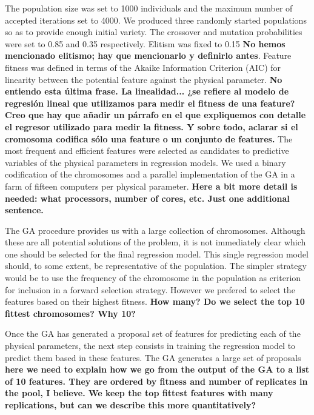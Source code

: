 The population size was set to 1000 individuals and the maximum number
of accepted iterations set to 4000. We produced three randomly started
populations so as to provide enough initial variety. The crossover and
mutation probabilities were set to 0.85 and 0.35 respectively. Elitism
was fixed to 0.15 {\bf No hemos mencionado elitismo; hay que
mencionarlo y definirlo antes}.  Feature fitness was defined in terms
of the Akaike Information Criterion (AIC) for linearity between the
potential feature against the physical parameter. {\bf No entiendo
esta última frase. La linealidad... ¿se refiere al modelo de regresión
lineal que utilizamos para medir el fitness de una feature? Creo que
hay que añadir un párrafo en el que expliquemos con detalle el
regresor utilizado para medir la fitness. Y sobre todo, aclarar si el
cromosoma codifica sólo una feature o un conjunto de features.} The
most frequent and efficient features were selected as candidates to
predictive variables of the physical parameters in regression
models. We used a binary codification of the chromosomes and a
parallel implementation of the GA in a farm of fifteen computers per
physical parameter. {\bf Here a bit more detail is needed: what
processors, number of cores, etc. Just one additional sentence.}

The GA procedure provides us with a large collection of chromosomes.
Although these are all potential solutions of the problem, it is not
immediately clear which one should be selected for the final
regression model.  This single regression model should, to some
extent, be representative of the population. The simpler strategy
would be to use the frequency of the chromosome in the population as
criterion for inclusion in a forward selection strategy. However we
prefered to select the features based on their highest fitness. {\bf
How many? Do we select the top 10 fittest chromosomes? Why 10?}

Once the GA has generated a proposal set of features for predicting
each of the physical parameters, the next step consists in training
the regression model to predict them based in these features.  The GA
generates a large set of proposals {\bf here we need to explain how we
go from the output of the GA to a list of 10 features. They are
ordered by fitness and number of replicates in the pool, I believe. We
keep the top fittest features with many replications, but can we
describe this more quantitatively?}

